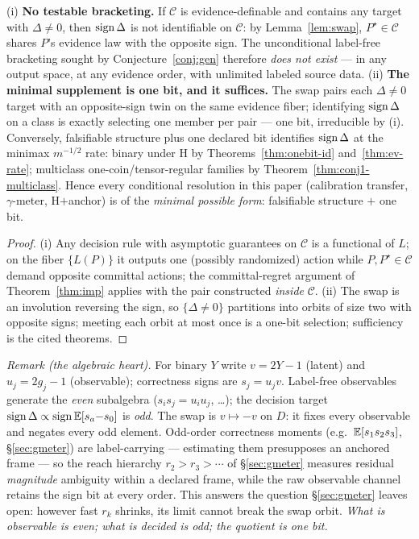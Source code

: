 \begin{theorem}\label{thm:conj1-dichotomy}
\textnormal{(i) \textbf{No testable bracketing.}} If $\mathcal C$ is evidence-definable
and contains any target with $\Delta\neq0$, then $\operatorname{sign}\Delta$ is not identifiable on
$\mathcal C$: by Lemma~\ref{lem:swap}, $P^\star\in\mathcal C$ shares $P$'s evidence law
with the opposite sign. The unconditional label-free bracketing sought by
Conjecture~\ref{conj:gen} therefore \emph{does not exist} --- in any output space, at
any evidence order, with unlimited labeled source data.
\textnormal{(ii) \textbf{The minimal supplement is one bit, and it suffices.}} The swap
pairs each $\Delta\neq0$ target with an opposite-sign twin on the same evidence fiber;
identifying $\operatorname{sign}\Delta$ on a class is exactly selecting one member per pair --- one
bit, irreducible by (i). Conversely, falsifiable structure plus one declared bit
identifies $\operatorname{sign}\Delta$ at the minimax $m^{-1/2}$ rate: binary under H by
Theorems~\ref{thm:onebit-id} and~\ref{thm:ev-rate}; multiclass one-coin/tensor-regular
families by Theorem~\ref{thm:conj1-multiclass}. Hence every conditional resolution in
this paper (calibration transfer, $\gamma$-meter, H$+$anchor) is of the \emph{minimal
possible form}: falsifiable structure $+$ one bit.
\end{theorem}
\begin{proof}
(i) Any decision rule with asymptotic guarantees on $\mathcal C$ is a functional of
$L$; on the fiber $\{L(P)\}$ it outputs one (possibly randomized) action while
$P,P^\star\in\mathcal C$ demand opposite committal actions; the committal-regret
argument of Theorem~\ref{thm:imp} applies with the pair constructed \emph{inside}
$\mathcal C$. (ii) The swap is an involution reversing the sign, so $\{\Delta\neq0\}$
partitions into orbits of size two with opposite signs; meeting each orbit at most once
is a one-bit selection; sufficiency is the cited theorems.
\end{proof}

\noindent\emph{Remark (the algebraic heart).} For binary $Y$ write $v=2Y{-}1$ (latent)
and $u_j=2g_j{-}1$ (observable); correctness signs are $s_j=u_jv$. Label-free
observables generate the \emph{even} subalgebra ($s_is_j=u_iu_j$, \dots); the decision
target $\operatorname{sign}\Delta\propto\operatorname{sign}\mathbb{E}[s_a{-}s_0]$ is \emph{odd}. The swap is $v\mapsto-v$ on
$D$: it fixes every observable and negates every odd element. Odd-order correctness
moments (e.g.\ $\mathbb{E}[s_1s_2s_3]$, \S\ref{sec:gmeter}) are label-carrying --- estimating
them presupposes an anchored frame --- so the reach hierarchy $r_2>r_3>\cdots$ of
\S\ref{sec:gmeter} measures residual \emph{magnitude} ambiguity within a declared
frame, while the raw observable channel retains the sign bit at every order. This
answers the question \S\ref{sec:gmeter} leaves open: however fast $r_k$ shrinks, its
limit cannot break the swap orbit. \emph{What is observable is even; what is decided is
odd; the quotient is one bit.}

